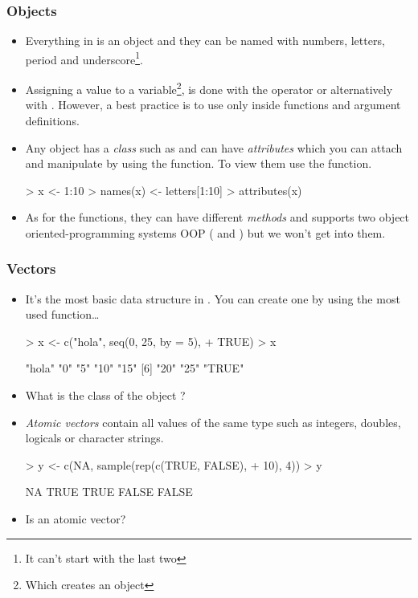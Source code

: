 \begin{frame}
  \frametitle{Objects}
  \begin{itemize}
  \item Everything in  is an object and they can be named with numbers, letters, period and underscore\footnote{It can't start with the last two}.
  \item Assigning a value to a variable\footnote{Which creates an object}, is done with the \pl{<-} operator or alternatively with \pl{=}. However, a best practice is to use \pl{=} only inside functions and argument definitions.
  \item Any object has a \emph{class} such as  and can have \emph{attributes} which you can attach and manipulate by using the  function. To view them use the  function.
\begin{Schunk}
\begin{Sinput}
> x <- 1:10
> names(x) <- letters[1:10]
> attributes(x)
\end{Sinput}
\end{Schunk}
  \item As for the functions, they can have different \emph{methods} and  supports two object oriented-programming systems OOP ( and ) but we won't get into them.
  \end{itemize}
\end{frame}

\begin{frame}
  \frametitle{Vectors}
  \begin{itemize}
  \item It's the most basic data structure in . You can create one by using the \alert{most} used  function\ldots {} 
\begin{Schunk}
\begin{Sinput}
> x <- c("hola", seq(0, 25, by = 5), 
+     TRUE)
> x
\end{Sinput}
\begin{Soutput}
[1] "hola" "0"    "5"    "10"   "15"  
[6] "20"   "25"   "TRUE"
\end{Soutput}
\end{Schunk}
  \item What is the class of the object ?
  \item \emph{Atomic vectors} contain all values of the same type such as integers, doubles, logicals or character strings.
\begin{Schunk}
\begin{Sinput}
> y <- c(NA, sample(rep(c(TRUE, FALSE), 
+     10), 4))
> y
\end{Sinput}
\begin{Soutput}
[1]    NA  TRUE  TRUE FALSE FALSE
\end{Soutput}
\end{Schunk}
  \item Is  an atomic vector?
  \end{itemize}
\end{frame}

